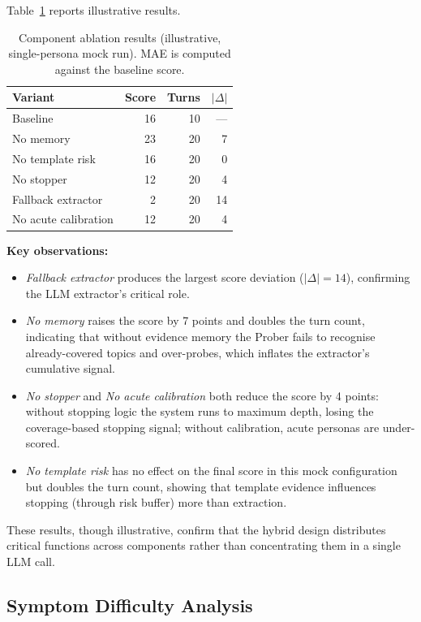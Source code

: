\documentclass[]{ceurart}
\begin{document}
Table~\ref{tab:ablation} reports illustrative results.

\begin{table}[t]
\caption{Component ablation results (illustrative, single-persona mock run). MAE is computed against the baseline score.}
\label{tab:ablation}
\centering
\small
\begin{tabular}{lrrr}
\toprule
\textbf{Variant} & \textbf{Score} & \textbf{Turns} & \textbf{$|\Delta|$} \\
\midrule
Baseline               & 16 & 10 & --- \\
No memory              & 23 & 20 & 7 \\
No template risk       & 16 & 20 & 0 \\
No stopper             & 12 & 20 & 4 \\
Fallback extractor     &  2 & 20 & 14 \\
No acute calibration   & 12 & 20 & 4 \\
\bottomrule
\end{tabular}
\end{table}

\textbf{Key observations:}
\begin{itemize}
\item \emph{Fallback extractor} produces the largest score deviation ($|\Delta| = 14$), confirming the LLM extractor's critical role.
\item \emph{No memory} raises the score by 7 points and doubles the turn count, indicating that without evidence memory the Prober fails to recognise already-covered topics and over-probes, which inflates the extractor's cumulative signal.
\item \emph{No stopper} and \emph{No acute calibration} both reduce the score by 4 points: without stopping logic the system runs to maximum depth, losing the coverage-based stopping signal; without calibration, acute personas are under-scored.
\item \emph{No template risk} has no effect on the final score in this mock configuration but doubles the turn count, showing that template evidence influences stopping (through risk buffer) more than extraction.
\end{itemize}

These results, though illustrative, confirm that the hybrid design distributes critical functions across components rather than concentrating them in a single LLM call.


\subsection{Symptom Difficulty Analysis}\label{sec:difficulty}
\end{document}
